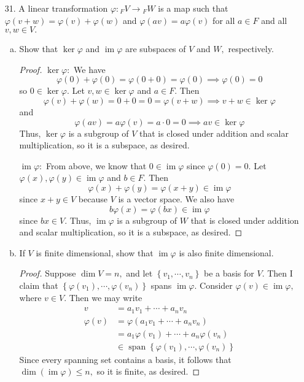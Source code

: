 \documentclass{article}
\DeclareMathOperator{\ima}{im}
\DeclareMathOperator{\spn}{span}
\begin{document}
\begin{itemize}
	\item[31.] A linear transformation $\varphi:{} _F V\to {}_F W$ is a map such that $\varphi(v+w)=\varphi(v)+\varphi(w)$ and $\varphi(av)=a\varphi(v)$ for all $a\in F$ and all $v, w\in V.$ 
		\begin{enumerate}[(a)]
			\item Show that $\ker\varphi$ and $\ima\varphi$ are subspaces of $V$ and $W,$ respectively.
				\begin{proof}
					$\ker\varphi:$ We have
					\[\varphi(0)+\varphi(0)=\varphi(0+0)=\varphi(0)\implies \varphi(0)=0\]
					so $0\in\ker\varphi.$ Let $v, w\in\ker\varphi$ and $a\in F.$ Then
					\[\varphi(v)+\varphi(w)=0+0=0=\varphi(v+w)\implies v+w\in\ker\varphi\]
					and
					\[\varphi(av) = a\varphi(v)=a\cdot 0 = 0\implies av\in \ker\varphi\]
					Thus, $\ker\varphi$ is a subgroup of $V$ that is closed under addition and scalar multiplication, so it is a subspace, as desired.

					$\ima\varphi:$ From above, we know that $0\in\ima\varphi$ since $\varphi(0)=0.$ Let $\varphi(x), \varphi(y)\in\ima\varphi$ and $b\in F.$ Then 
					\[\varphi(x)+\varphi(y) = \varphi(x+y)\in \ima\varphi\]
					since $x+y\in V$ because $V$ is a vector space. We also have
					\[b\varphi(x)=\varphi(bx) \in\ima\varphi\]
					since $bx\in V.$ Thus, $\ima\varphi$ is a subgroup of $W$ that is closed under addition and scalar multiplication, so it is a subspace, as desired.
				\end{proof}

			\item If $V$ is finite dimensional, show that $\ima \varphi$ is also finite dimensional. 
				\begin{proof}
					Suppose $\dim V=n,$ and let $\left\{ v_1, \cdots, v_n \right\}$ be a basis for $V.$ Then I claim that $\left\{ \varphi(v_1), \cdots, \varphi(v_n) \right\}$ spans $\ima \varphi.$ Consider $\varphi(v)\in\ima \varphi,$ where $v\in V.$ Then we may write
					\begin{align*}
						v &= a_1v_1+\cdots+a_nv_n \\
						\varphi(v) &= \varphi(a_1v_1+\cdots+a_nv_n) \\
						&= a_1\varphi(v_1)+\cdots+a_n\varphi(v_n) \\
						&\in \spn\left\{ \varphi(v_1), \cdots, \varphi(v_n) \right\}
					\end{align*}
					Since every spanning set contains a basis, it follows that $\dim (\ima \varphi)\le n,$ so it is finite, as desired.
				\end{proof}


\end{enumerate}
\end{itemize}
\end{document}
